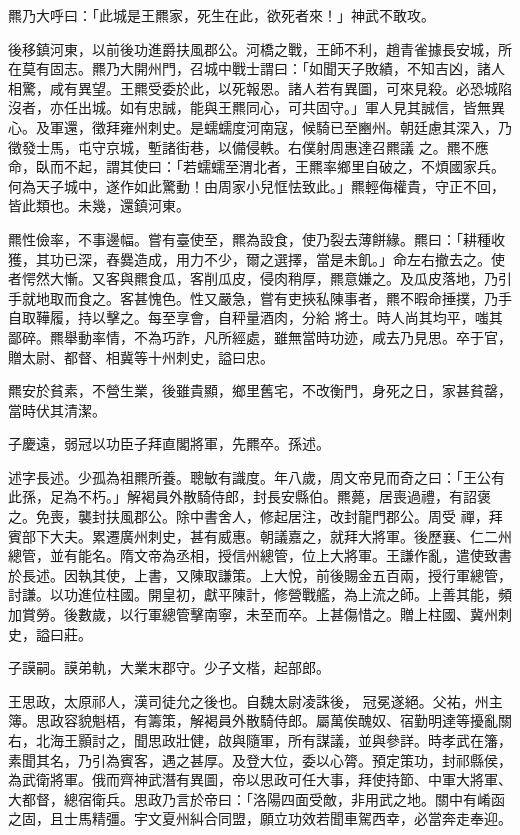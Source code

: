 \begin{pinyinscope}
 羆乃大呼曰：「此城是王羆家，死生在此，欲死者來！」神武不敢攻。



 後移鎮河東，以前後功進爵扶風郡公。河橋之戰，王師不利，趙青雀據長安城，所在莫有固志。羆乃大開州門，召城中戰士謂曰：「如聞天子敗績，不知吉凶，諸人相驚，咸有異望。王羆受委於此，以死報恩。諸人若有異圖，可來見殺。必恐城陷沒者，亦任出城。如有忠誠，能與王羆同心，可共固守。」軍人見其誠信，皆無異心。及軍還，徵拜雍州刺史。是蠕蠕度河南寇，候騎已至豳州。朝廷慮其深入，乃徵發士馬，屯守京城，塹諸街巷，以備侵軼。右僕射周惠達召羆議
 之。羆不應命，臥而不起，謂其使曰：「若蠕蠕至渭北者，王羆率鄉里自破之，不煩國家兵。何為天子城中，遂作如此驚動！由周家小兒恇怯致此。」羆輕侮權貴，守正不回，皆此類也。未幾，還鎮河東。



 羆性儉率，不事邊幅。嘗有臺使至，羆為設食，使乃裂去薄餅緣。羆曰：「耕種收獲，其功已深，舂爨造成，用力不少，爾之選擇，當是未飢。」命左右撤去之。使者愕然大慚。又客與羆食瓜，客削瓜皮，侵肉稍厚，羆意嫌之。及瓜皮落地，乃引手就地取而食之。客甚愧色。性又嚴急，嘗有吏挾私陳事者，羆不暇命捶撲，乃手自取鞾履，持以擊之。每至享會，自秤量酒肉，分給
 將士。時人尚其均平，嗤其鄙碎。羆舉動率情，不為巧詐，凡所經處，雖無當時功迹，咸去乃見思。卒于官，贈太尉、都督、相冀等十州刺史，謚曰忠。



 羆安於貧素，不營生業，後雖貴顯，鄉里舊宅，不改衡門，身死之日，家甚貧罄，當時伏其清潔。



 子慶遠，弱冠以功臣子拜直閣將軍，先羆卒。孫述。



 述字長述。少孤為祖羆所養。聰敏有識度。年八歲，周文帝見而奇之曰：「王公有此孫，足為不朽。」解褐員外散騎侍郎，封長安縣伯。羆薨，居喪過禮，有詔褒之。免喪，襲封扶風郡公。除中書舍人，修起居注，改封龍門郡公。周受
 禪，拜賓部下大夫。累遷廣州刺史，甚有威惠。朝議嘉之，就拜大將軍。後歷襄、仁二州總管，並有能名。隋文帝為丞相，授信州總管，位上大將軍。王謙作亂，遣使致書於長述。因執其使，上書，又陳取謙策。上大悅，前後賜金五百兩，授行軍總管，討謙。以功進位柱國。開皇初，獻平陳計，修營戰艦，為上流之師。上善其能，頻加賞勞。後數歲，以行軍總管擊南寧，未至而卒。上甚傷惜之。贈上柱國、冀州刺史，謚曰莊。



 子謨嗣。謨弟軌，大業末郡守。少子文楷，起部郎。



 王思政，太原祁人，漢司徒允之後也。自魏太尉凌誅後，
 冠冕遂絕。父祐，州主簿。思政容貌魁梧，有籌策，解褐員外散騎侍郎。屬萬俟醜奴、宿勤明達等擾亂關右，北海王顥討之，聞思政壯健，啟與隨軍，所有謀議，並與參詳。時孝武在籓，素聞其名，乃引為賓客，遇之甚厚。及登大位，委以心膂。預定策功，封祁縣侯，為武衛將軍。俄而齊神武潛有異圖，帝以思政可任大事，拜使持節、中軍大將軍、大都督，總宿衛兵。思政乃言於帝曰：「洛陽四面受敵，非用武之地。關中有崤函之固，且士馬精彊。宇文夏州糾合同盟，願立功效若聞車駕西幸，必當奔走奉迎。




\end{pinyinscope}
